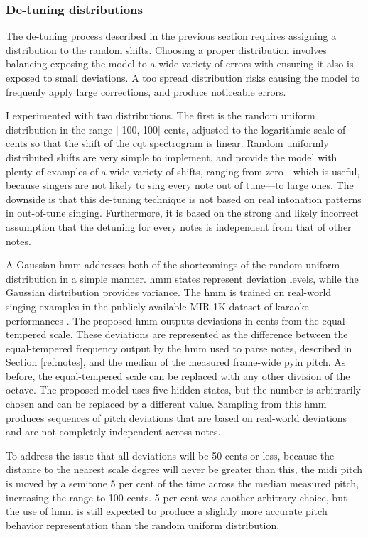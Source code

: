 \subsubsection{De-tuning distributions}
The de-tuning process described in the previous section requires assigning a distribution to the random shifts. Choosing a proper distribution involves balancing exposing the model to a wide variety of errors with ensuring it also is exposed to small deviations. A too spread distribution risks causing the model to frequenly apply large corrections, and produce noticeable errors. 

I experimented with two distributions. The first is the random uniform distribution in the range [-100, 100] cents, adjusted to the logarithmic scale of cents so that the shift of the \gls{cqt} spectrogram is linear. Random uniformly distributed shifts are very simple to implement, and provide the model with plenty of examples of a wide variety of shifts, ranging from zero---which is useful, because singers are not likely to sing every note out of tune---to large ones. The downside is that this de-tuning technique is not based on real intonation patterns in out-of-tune singing. Furthermore, it is based on the strong and likely incorrect assumption that the detuning for every notes is independent from that of other notes.

A Gaussian \gls{hmm} addresses both of the shortcomings of the random uniform distribution in a simple manner. \gls{hmm} states represent deviation levels, while the Gaussian distribution provides variance. The \gls{hmm} is trained on real-world singing examples in the publicly available MIR-1K dataset of karaoke performances \cite{su2009improvement}. The proposed \gls{hmm} outputs deviations in cents from the equal-tempered scale. These deviations are represented as the difference between the equal-tempered frequency output by the \gls{hmm} used to parse notes, described in Section \ref{ref:notes}, and the median of the measured frame-wide \gls{pyin} pitch. As before, the equal-tempered scale can be replaced with any other division of the octave. The proposed model uses five hidden states, but the number is arbitrarily chosen and can be replaced by a different value.  Sampling from this \gls{hmm} produces sequences of pitch deviations that are based on real-world deviations and are not completely independent across notes.

To address the issue that all deviations will be 50 cents or less, because the distance to the nearest scale degree will never be greater than this, the \gls{midi} pitch is moved by a semitone 5 per cent of the time across the median measured pitch, increasing the range to 100 cents. 5 per cent was another arbitrary choice, but the use of \gls{hmm} is still expected to produce a slightly more accurate pitch behavior representation than the random uniform distribution.

